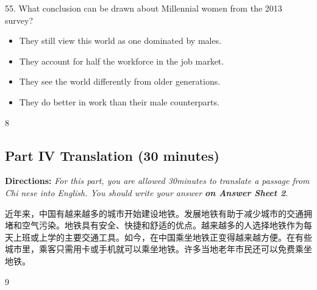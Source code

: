 \documentclass[UTF8,11pt]{ctexart}
\begin{document}
55. What conclusion can be drawn about Millennial women from the 2013 survey?


\begin{itemize}[leftmargin=2em,itemsep=.2em,topsep=.4em]\item[A.] They still view this world as one dominated by males.
\item[B.] They account for half the workforce in the job market.
\item[C.] They see the world differently from older generations.
\item[D.] They do better in work than their male counterparts.
\end{itemize}

8


\subsection*{\textbf{Part IV} \textbf{Translation} \textbf{(30 minutes)}}


\textbf{Directions:}\textit{ For this part, you are allowed 30minutes to translate a passage from Chi} \textit{nese into English. You should write your answer}\textbf{\textit{ on Answer Sheet 2}}\textit{.}


近年来，中国有越来越多的城市开始建设地铁。发展地铁有助于减少城市的交通拥堵和空气污染。地铁具有安全、快捷和舒适的优点。越来越多的人选择地铁作为每天上班或上学的主要交通工具。如今，在中国乘坐地铁正变得越来越方便。在有些城市里，乘客只需用卡或手机就可以乘坐地铁。许多当地老年市民还可以免费乘坐地铁。


9
\end{document}
